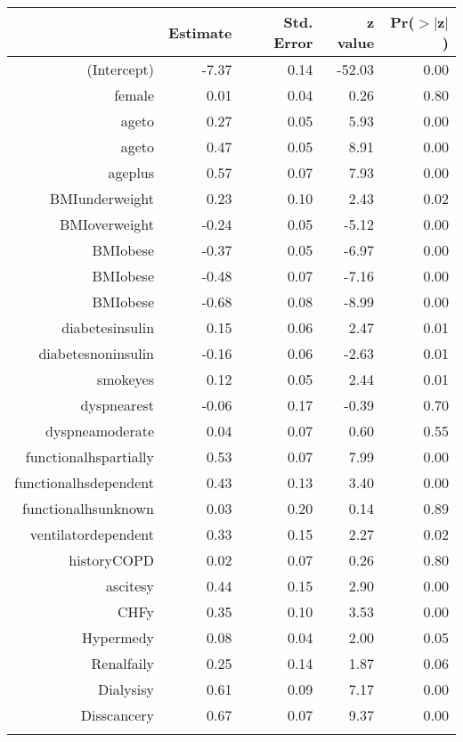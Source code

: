 \bigskip\bigskip
\centering
\begin{tabular}{rrrrr}
  \hline
 & Estimate & Std. Error & z value & Pr($>$$|$z$|$) \\ 
  \hline
(Intercept) & -7.37 & 0.14 & -52.03 & 0.00 \\ 
  female & 0.01 & 0.04 & 0.26 & 0.80 \\ 
  age\-65\-to\-74 & 0.27 & 0.05 & 5.93 & 0.00 \\ 
  age\-75\-to\-84 & 0.47 & 0.05 & 8.91 & 0.00 \\ 
  age\-85\-plus & 0.57 & 0.07 & 7.93 & 0.00 \\ 
  BMI\-underweight & 0.23 & 0.10 & 2.43 & 0.02 \\ 
  BMI\-overweight & -0.24 & 0.05 & -5.12 & 0.00 \\ 
  BMI\-obese\-1 & -0.37 & 0.05 & -6.97 & 0.00 \\ 
  BMI\-obese\-2 & -0.48 & 0.07 & -7.16 & 0.00 \\ 
  BMI\-obese\-3 & -0.68 & 0.08 & -8.99 & 0.00 \\ 
  diabetes\-insulin & 0.15 & 0.06 & 2.47 & 0.01 \\ 
  diabetes\-noninsulin & -0.16 & 0.06 & -2.63 & 0.01 \\ 
  smoke\-yes & 0.12 & 0.05 & 2.44 & 0.01 \\ 
  dyspnea\-rest & -0.06 & 0.17 & -0.39 & 0.70 \\ 
  dyspnea\-moderate & 0.04 & 0.07 & 0.60 & 0.55 \\ 
  functional\-hs\-partially & 0.53 & 0.07 & 7.99 & 0.00 \\ 
  functional\-hs\-dependent & 0.43 & 0.13 & 3.40 & 0.00 \\ 
  functional\-hs\-unknown & 0.03 & 0.20 & 0.14 & 0.89 \\ 
  ventilator\-dependent & 0.33 & 0.15 & 2.27 & 0.02 \\ 
  history\-COPD & 0.02 & 0.07 & 0.26 & 0.80 \\ 
  ascites\-y & 0.44 & 0.15 & 2.90 & 0.00 \\ 
  CHF\-y & 0.35 & 0.10 & 3.53 & 0.00 \\ 
  Hyper\-med\-y & 0.08 & 0.04 & 2.00 & 0.05 \\ 
  Renal\-fail\-y & 0.25 & 0.14 & 1.87 & 0.06 \\ 
  Dialysis\-y & 0.61 & 0.09 & 7.17 & 0.00 \\ 
  Diss\-cancer\-y & 0.67 & 0.07 & 9.37 & 0.00 \\ 
$$
\end{tabular}
